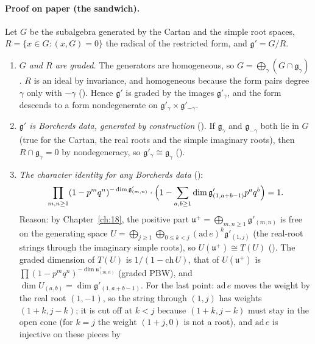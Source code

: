 \paragraph{Proof on paper (the sandwich).}  Let $G$ be the subalgebra generated by the Cartan and the simple root
spaces, $R=\{x\in G:(x,G)=0\}$ the radical of the restricted form, and $\mathfrak g'=G/R$.
\begin{enumerate}[label=(\arabic*)]
\item \emph{$G$ and $R$ are graded.}  The generators are homogeneous, so $G=\bigoplus_\gamma(G\cap\mathfrak g_\gamma)$.  $R$ is
  an ideal by invariance, and homogeneous because the form pairs degree $\gamma$ only with $-\gamma$
  ().  Hence $\mathfrak g'$ is graded by the images $\mathfrak g'_\gamma$, and the form descends to a
  form nondegenerate on $\mathfrak g'_\gamma\times\mathfrak g'_{-\gamma}$.
\item \emph{$\mathfrak g'$ is Borcherds data, generated by construction} ().  If $\mathfrak g_\gamma$ and
  $\mathfrak g_{-\gamma}$ both lie in $G$ (true for the Cartan, the real roots and the simple imaginary roots), then
  $R\cap\mathfrak g_\gamma=0$ by nondegeneracy, so $\mathfrak g'_\gamma\cong\mathfrak g_\gamma$ ().
\item \emph{The character identity for any Borcherds data} ():
  \begin{equation*}
    \prod_{m,n\ge1}(1-p^mq^n)^{-\dim\mathfrak g'_{(m,n)}}\cdot\Bigl(1-\sum_{a,b\ge1}\dim\mathfrak g'_{(1,a+b-1)}p^aq^b\Bigr)=1 .
  \end{equation*}
  Reason: by Chapter~\ref{ch:18}, the positive part $\mathfrak u^+=\bigoplus_{m,n\ge1}\mathfrak g'_{(m,n)}$ is free on the
  generating space $U=\bigoplus_{j\ge1}\bigoplus_{0\le k<j}(\mathrm{ad}\,e)^k\mathfrak g'_{(1,j)}$ (the real-root strings through
  the imaginary simple roots), so $U(\mathfrak u^+)\cong T(U)$ ().  The
  graded dimension of $T(U)$ is $1/(1-\mathrm{ch}\,U)$, that of $U(\mathfrak u^+)$ is $\prod(1-p^mq^n)^{-\dim\mathfrak u^+_{(m,n)}}$
  (graded PBW), and $\dim U_{(a,b)}=\dim\mathfrak g'_{(1,a+b-1)}$.  For the last point: $\mathrm{ad}\,e$ moves the weight by the
real root $(1,-1)$, so the string through $(1,j)$ has weights $(1+k,j-k)$; it is cut off at $k<j$ because $(1+k,j-k)$ must stay
in the open cone (for $k=j$ the weight $(1+j,0)$ is not a root), and $\mathrm{ad}\,e$ is injective on these pieces by

\end{enumerate}

